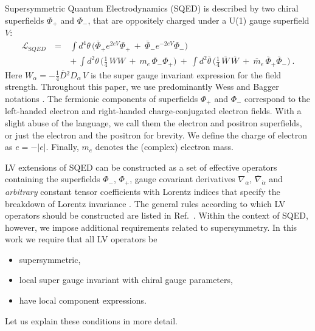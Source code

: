 \documentclass[12pt]{revtex4}
\begin{document}
Supersymmetric Quantum Electrodynamics (SQED) is described
by two chiral superfields $ \Phi_+ $ and $ \Phi_- $, that 
are oppositely charged under a U(1) gauge superfield $ V $: 
\begin{eqnarray}
\mathcal{L}_{\mathrm SQED} & ~=~
&
\int d^4\theta\, \Big(
   \overline{\Phi}_+ e^{2eV} \Phi_+ ~+~
   \overline{\Phi}_- e^{-2eV} {\Phi}_-  \Big) \\
\label{SQED}
&& +~   
\int d^2\theta\, \Big( \frac{1}{4}\,  WW ~+~m_e\, \Phi_-\Phi_+ \Big) ~+~
\int d^2\overline{\theta}\, 
\Big( \frac{1}{4}\, \overline{W}\,\overline{W} ~+~ 
\overline{m}_e\, \overline{\Phi}_+\overline{\Phi}_- \Big)~.
\nonumber
\end{eqnarray}
%
Here $ W_\alpha = - \frac{1}{4} \overline{D}{}^2 D_\alpha\, {V} $ 
is the super gauge invariant expression for the field strength. 
Throughout this paper, we use predominantly Wess and
Bagger notations \cite{Wess:1992cp}. The fermionic components of
superfields $ \Phi_+ $ and $ \Phi_- $ correspond to the left-handed
electron and right-handed charge-conjugated electron fields. With a   
slight abuse of the language, we call them the electron and positron 
superfields, or just the electron and the positron for brevity. We
define the charge of electron as $ e = - | e | $. 
Finally, $m_e$ denotes the (complex) electron mass. 


LV extensions of SQED can be constructed as a set of effective
operators containing the superfields $\Phi_-$, $\Phi_+$,
gauge covariant derivatives $ \nabla_\alpha $, 
$ \overline{\nabla}_{\dot\alpha} $ and {\em arbitrary} constant tensor
coefficients with Lorentz indices  that specify the
breakdown of Lorentz invariance \cite{GrootNibbelink:2004za}. 
The general rules according to which LV operators should be
constructed are listed in Ref.\ \cite{MP:}. 
Within the context of SQED, however, we impose additional
requirements related to supersymmetry.
In this work we require
that all LV operators be  
\begin{itemize}
\item supersymmetric, 
\item local super gauge invariant with chiral gauge parameters, 
\item have local component expressions. 
\end{itemize}
Let us explain these conditions in more detail. 
\end{document}
